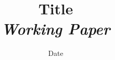 


\title{Title\bigskip\\
\textit{Working Paper}
}
\author{}
\date{Date}


\maketitle

\begin{abstract}

\end{abstract}






















